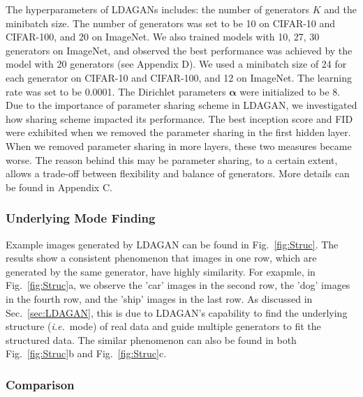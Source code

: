\documentclass{article}
\def\ie{\emph{i.e.}}
\begin{document}
The hyperparameters of LDAGANs includes: the number of generators $K$ and the minibatch size.
The number of generators was set to be 10 on CIFAR-10 and CIFAR-100, and 20 on ImageNet.
We also trained models with 10, 27, 30 generators on ImageNet, and observed the best performance was achieved by the model with 20 generators (see  Appendix D).
We used a minibatch size of 24 for each generator on CIFAR-10 and CIFAR-100, and 12 on ImageNet.
The learning rate was set to be 0.0001.
The Dirichlet parameters $\bm{\alpha}$ were initialized to be 8.
Due to the importance of parameter sharing scheme in LDAGAN, we investigated how sharing scheme impacted its performance.
The best inception score and FID were exhibited when we removed the parameter sharing in the first hidden layer.
When we removed parameter sharing in more layers, these two measures became worse.
The reason behind this may be parameter sharing, to a certain extent, allows a trade-off between flexibility and balance of generators.
More details can be found in Appendix C.



\subsubsection{Underlying Mode Finding}
\label{sec:Struc}

Example images generated by LDAGAN can be found in Fig.~\ref{fig:Struc}.
The results show a consistent phenomenon that images in one row, which are generated by the same generator, have highly similarity.
For exapmle, in Fig.~\ref{fig:Struc}a, we observe the 'car' images in the second row, the 'dog' images in the fourth row, and the 'ship' images in the last row.
As discussed in Sec.~\ref{sec:LDAGAN}, this is due to LDAGAN's capability to find the underlying structure (\ie~mode) of real data and guide multiple generators to fit the structured data.
The similar phenomenon can also be found in both Fig.~\ref{fig:Struc}b and Fig.~\ref{fig:Struc}c.

\subsubsection{Comparison}
\label{sec:Comp}
\end{document}

